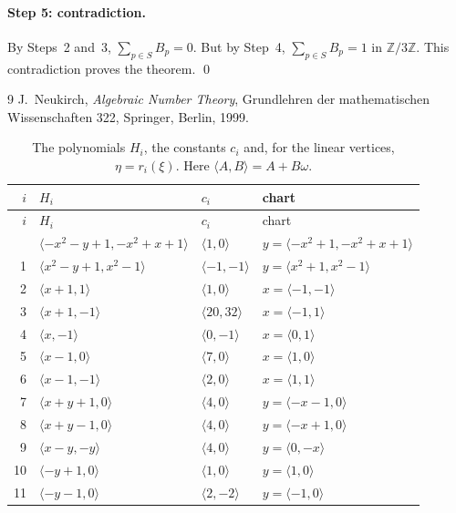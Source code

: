 \documentclass[11pt]{article}
\newcommand{\Z}{\mathbb{Z}}
\begin{document}
\paragraph{Step 5: contradiction.} By Steps~2 and~3, $\sum_{p\in S}B_p=0$. But by Step~4, $\sum_{p\in S}B_p=1$ in $\Z/3\Z$. This contradiction proves the theorem.
\qed


\begin{thebibliography}{9}
 J.~Neukirch, \emph{Algebraic Number Theory}, Grundlehren der mathematischen Wissenschaften 322, Springer, Berlin, 1999.
\end{thebibliography}

\clearpage
\begingroup\small
\setlength{\LTcapwidth}{\textwidth}
\begin{longtable}{@{}rlll@{}}
\caption{The polynomials $H_i$, the constants $c_i$ and, for the linear vertices, $\eta=r_i(\xi)$. Here $\langle A,B\rangle=A+B\omega$.}\label{tab:vert1}\\
\hline $i$ & $H_i$ & $c_i$ & chart\\\hline\endfirsthead\hline $i$ & $H_i$ & $c_i$ & chart\\\hline\endhead\hline\endfoot
0 & $\langle -x^{2}-y+1,-x^{2}+x+1\rangle$ & $\langle 1,0\rangle$ & $y=\langle -x^{2}+1,-x^{2}+x+1\rangle$\\
1 & $\langle x^{2}-y+1,x^{2}-1\rangle$ & $\langle -1,-1\rangle$ & $y=\langle x^{2}+1,x^{2}-1\rangle$\\
2 & $\langle x+1,1\rangle$ & $\langle 1,0\rangle$ & $x=\langle -1,-1\rangle$\\
3 & $\langle x+1,-1\rangle$ & $\langle 20,32\rangle$ & $x=\langle -1,1\rangle$\\
4 & $\langle x,-1\rangle$ & $\langle 0,-1\rangle$ & $x=\langle 0,1\rangle$\\
5 & $\langle x-1,0\rangle$ & $\langle 7,0\rangle$ & $x=\langle 1,0\rangle$\\
6 & $\langle x-1,-1\rangle$ & $\langle 2,0\rangle$ & $x=\langle 1,1\rangle$\\
7 & $\langle x+y+1,0\rangle$ & $\langle 4,0\rangle$ & $y=\langle -x-1,0\rangle$\\
8 & $\langle x+y-1,0\rangle$ & $\langle 4,0\rangle$ & $y=\langle -x+1,0\rangle$\\
9 & $\langle x-y,-y\rangle$ & $\langle 4,0\rangle$ & $y=\langle 0,-x\rangle$\\
10 & $\langle -y+1,0\rangle$ & $\langle 1,0\rangle$ & $y=\langle 1,0\rangle$\\
11 & $\langle -y-1,0\rangle$ & $\langle 2,-2\rangle$ & $y=\langle -1,0\rangle$\\

\end{longtable}
\end{document}
